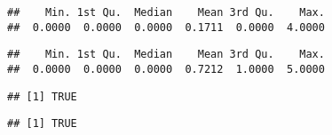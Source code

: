 \documentclass[
]{article}
\newenvironment{Shaded}{\begin{snugshade}}{\end{snugshade}}
\newcommand{\FunctionTok}[1]{\textcolor[rgb]{0.13,0.29,0.53}{\textbf{#1}}}
\newcommand{\NormalTok}[1]{#1}
\newcommand{\SpecialCharTok}[1]{\textcolor[rgb]{0.81,0.36,0.00}{\textbf{#1}}}
\begin{document}
\begin{Shaded}
\end{Shaded}

\begin{verbatim}
##    Min. 1st Qu.  Median    Mean 3rd Qu.    Max. 
##  0.0000  0.0000  0.0000  0.1711  0.0000  4.0000
\end{verbatim}

\begin{Shaded}
\end{Shaded}

\begin{verbatim}
##    Min. 1st Qu.  Median    Mean 3rd Qu.    Max. 
##  0.0000  0.0000  0.0000  0.7212  1.0000  5.0000
\end{verbatim}

\begin{Shaded}
\end{Shaded}

\begin{verbatim}
## [1] TRUE
\end{verbatim}

\begin{Shaded}
\end{Shaded}

\begin{verbatim}
## [1] TRUE
\end{verbatim}

\begin{Shaded}
\end{Shaded}
\end{document}
